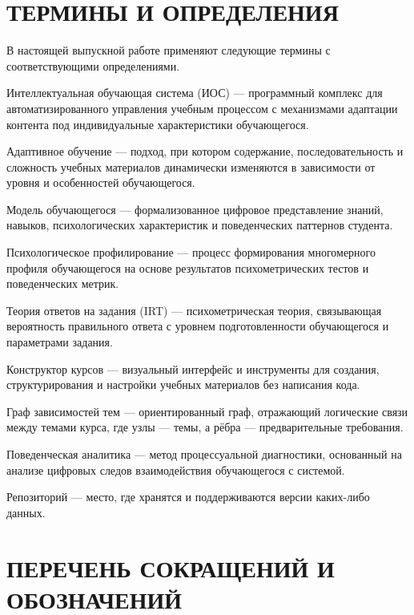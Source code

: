 \documentclass[a4paper,12pt]{article}
\begin{document}
\pagebreak

\tableofcontents

\pagebreak


\section*{\centering ТЕРМИНЫ И ОПРЕДЕЛЕНИЯ}
В настоящей выпускной работе применяют следующие термины с соответствующими определениями.

Интеллектуальная обучающая система (ИОС) --- программный комплекс для автоматизированного управления учебным процессом с механизмами адаптации контента под индивидуальные характеристики обучающегося.

Адаптивное обучение --- подход, при котором содержание, последовательность и сложность учебных материалов динамически изменяются в зависимости от уровня и особенностей обучающегося.

Модель обучающегося --- формализованное цифровое представление знаний, навыков, психологических характеристик и поведенческих паттернов студента.

Психологическое профилирование --- процесс формирования многомерного профиля обучающегося на основе результатов психометрических тестов и поведенческих метрик.

Теория ответов на задания (IRT) --- психометрическая теория, связывающая вероятность правильного ответа с уровнем подготовленности обучающегося и параметрами задания.

Конструктор курсов --- визуальный интерфейс и инструменты для создания, структурирования и настройки учебных материалов без написания кода.

Граф зависимостей тем --- ориентированный граф, отражающий логические связи между темами курса, где узлы --- темы, а рёбра --- предварительные требования.

Поведенческая аналитика --- метод процессуальной диагностики, основанный на анализе цифровых следов взаимодействия обучающегося с системой.

Репозиторий --- место, где хранятся и поддерживаются версии каких-либо данных.
\pagebreak

\section*{\centering ПЕРЕЧЕНЬ СОКРАЩЕНИЙ И ОБОЗНАЧЕНИЙ}
\end{document}
